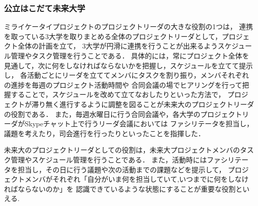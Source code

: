\subsubsection{公立はこだて未来大学}
\par
ミライケータイプロジェクトのプロジェクトリーダの大きな役割の1つは，
連携を取っている3大学を取りまとめる全体のプロジェクトリーダとして，プロジェクト全体の計画を立て，
3大学が円滑に連携を行うことが出来るようスケジュール管理やタスク管理を行うことである．
具体的には，常にプロジェクト全体を見通して，次に何をしなければならないかを把握し，スケジュールを立てて提示し，
各活動ごとにリーダを立ててメンバにタスクを割り振り，メンバそれぞれの進捗を毎週のプロジェクト活動時間や
合同会議の場でヒアリングを行って把握することで，スケジュールを改めて立てなおしたりといった方法で，
プロジェクトが滞り無く進行するように調整を図ることが未来大のプロジェクトリーダの役割である．
また，毎週水曜日に行う合同会議や，各大学のプロジェクトリーダがSkypeチャット上で行うリーダ会議においては
ファシリテータを担当し，議題を考えたり，司会進行を行ったりといったことを指揮した．

未来大のプロジェクトリーダとしての役割は，未来大プロジェクトメンバのタスク管理やスケジュール管理を行うことである．
また，活動時にはファシリテータを担当し，その日に行う議題や次の活動までの課題などを提示して，
プロジェクトメンバがそれぞれ「自分がいま何を担当していて,いつまでに何をしなければならないのか」を
認識できているような状態にすることが重要な役割といえる.

